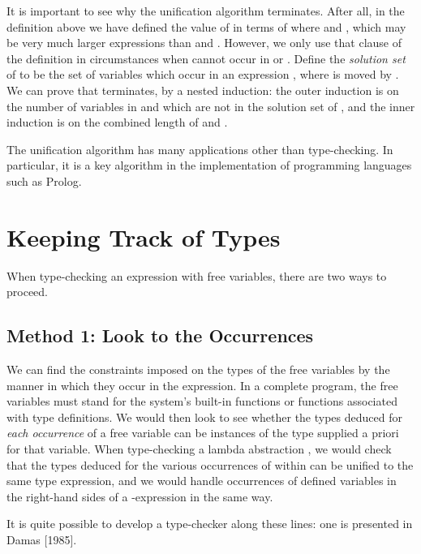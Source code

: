 It is important to see why the unification algorithm terminates. After all, in
the definition above we have defined the value of  in terms
of  where  and ,
which may be very much larger expressions than  and . However,
we only use that clause of the definition in circumstances when  cannot
occur in  or . Define the \textit{solution set} of  to be the set of variables
which occur in an expression , where  is moved by . We can
prove that  terminates, by a nested induction: the outer
induction is on the number of variables in  and  which are not in the
solution set of , and the inner induction is on the combined length of  and
.

The unification algorithm has many applications other than type-checking.
In particular, it is a key algorithm in the implementation of programming
languages such as Prolog.

\section{Keeping Track of Types}

When type-checking an expression with free variables, there are two ways to
proceed.

\subsection{Method 1: Look to the Occurrences}

We can find the constraints imposed on the types of the free variables by the
manner in which they occur in the expression. In a complete program, the free
variables must stand for the system's built-in functions or functions associated
with type definitions. We would then look to see whether the types deduced
for \textit{each occurrence} of a free variable can be instances of the type supplied a
priori for that variable. When type-checking a lambda abstraction , we
would check that the types deduced for the various occurrences of  within 
can be unified to the same type expression, and we would handle occurrences
of defined variables in the right-hand sides of a -expression in the same
way.

It is quite possible to develop a type-checker along these lines: one is
presented in Damas [1985].

